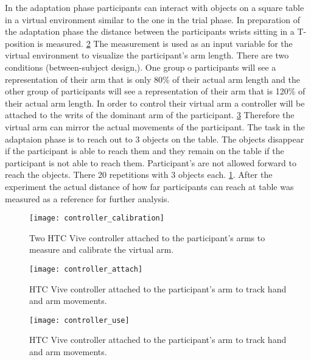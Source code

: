 In the adaptation phase participants can interact with objects on a square table in a virtual environment similar to the one in the trial phase. In preparation of the adaptation phase the distance between the participants wrists sitting in a T-position is measured. \ref{fig:controller_calibration} The measurement is used as an input variable for the virtual environment to visualize the participant's arm length. There are two conditions (between-subject design,). One group o participants will see a representation of their arm that is only 80\% of their actual arm length and the other group of participants will see a representation of their arm that is 120\% of their actual arm length. In order to control their virtual arm a controller will be attached to the writs of the dominant arm of the participant. \ref{fig:controller_attach} Therefore the virtual arm can mirror the actual movements of the participant. The task in the adaptaion phase is to reach out to 3 objects on the table. The objects disappear if the participant is able to reach them and they remain on the table if the participant is not able to reach them. Participant's are not allowed forward to reach the objects. There 20 repetitions with 3 objects each. \ref{fig:controller_use}.
After the experiment the actual distance of how far participants can reach at table was measured as a reference for further analysis.

\begin{figure}[h]
\centering
\texttt{[image: controller\_calibration]}
\caption{Two HTC Vive controller attached to the participant's arms to measure and calibrate the virtual arm.}
\label{fig:controller_use}
\end{figure}

\begin{figure}[h]
\centering
\texttt{[image: controller\_attach]}
\caption{HTC Vive controller attached to the participant's arm to track hand and arm movements.}
\label{fig:controller_calibration}
\end{figure}

\begin{figure}
\centering
  \texttt{[image: controller\_use]}
  \caption{HTC Vive controller attached to the participant's arm to track hand and arm movements.}
  \label{fig:controller_attach}
\end{figure}




